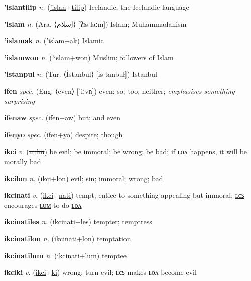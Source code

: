 \textbf{\hypertarget{'islantilip}{'islantilip}} \textit{n.} (\hyperlink{'islan}{'islan}+\allowbreak \hyperlink{tilip}{tilip})
Icelandic; the Icelandic language

\textbf{\hypertarget{'islam}{'islam}} \textit{n.} (Ara. ⟨{\arabics{}إسلام}⟩ [ʔɪsˈlaːm])
Islam; Muhammadanism

\textbf{\hypertarget{'islamak}{'islamak}} \textit{n.} (\hyperlink{'islam}{'islam}+\allowbreak \hyperlink{ak}{ak})
Islamic

\textbf{\hypertarget{'islamwon}{'islamwon}} \textit{n.} (\hyperlink{'islam}{'islam}+\allowbreak \hyperlink{won}{won})
Muslim; followers of Islam

\textbf{\hypertarget{'istanpul}{'istanpul}} \textit{n.} (Tur. ⟨İstanbul⟩ [isˈtanbuɫ])
Istanbul

\textbf{\hypertarget{ifen}{ifen}} \textit{spec.} (Eng. ⟨even⟩ [ˈiːvn̩])
even; so; too; neither; \textit{emphasises something surprising}

\textbf{\hypertarget{ifenaw}{ifenaw}} \textit{spec.} (\hyperlink{ifen}{ifen}+\allowbreak \hyperlink{aw}{aw})
but; and even

\textbf{\hypertarget{ifenyo}{ifenyo}} \textit{spec.} (\hyperlink{ifen}{ifen}+\allowbreak \hyperlink{yo}{yo})
despite; though

\textbf{\hypertarget{ikci}{ikci}} \textit{v.} (\hyperlink{unhu}{\sout{unhu}})
be evil; be immoral; be wrong; be bad; if \hyperlink{ikcilon}{ʟᴏᴧ} happens, it will be morally bad

\textbf{\hypertarget{ikcilon}{ikcilon}} \textit{n.} (\hyperlink{ikci}{ikci}+\allowbreak \hyperlink{lon}{lon})
evil; sin; immoral; wrong; bad

\textbf{\hypertarget{ikcinati}{ikcinati}} \textit{v.} (\hyperlink{ikci}{ikci}+\allowbreak \hyperlink{nati}{nati})
tempt; entice to something appealing but immoral; \hyperlink{ikcinatiles}{ʟєꜱ} encourages \hyperlink{ikcinatilum}{ʟᴜᴍ} to do \hyperlink{ikcinatilon}{ʟᴏᴧ}

\textbf{\hypertarget{ikcinatiles}{ikcinatiles}} \textit{n.} (\hyperlink{ikcinati}{ikcinati}+\allowbreak \hyperlink{les}{les})
tempter; temptress

\textbf{\hypertarget{ikcinatilon}{ikcinatilon}} \textit{n.} (\hyperlink{ikcinati}{ikcinati}+\allowbreak \hyperlink{lon}{lon})
temptation

\textbf{\hypertarget{ikcinatilum}{ikcinatilum}} \textit{n.} (\hyperlink{ikcinati}{ikcinati}+\allowbreak \hyperlink{lum}{lum})
temptee

\textbf{\hypertarget{ikciki}{ikciki}} \textit{v.} (\hyperlink{ikci}{ikci}+\allowbreak \hyperlink{ki}{ki})
wrong; turn evil; ʟєꜱ makes ʟᴏᴧ become evil

